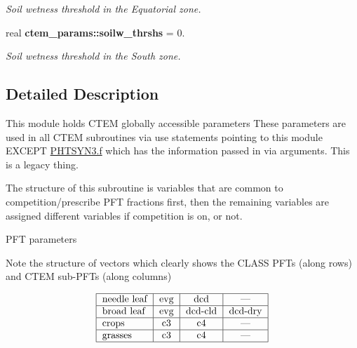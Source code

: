 \begin{DoxyCompactItemize}
\begin{DoxyCompactList}\small\item\em Soil wetness threshold in the Equatorial zone. \end{DoxyCompactList}\item 
\hypertarget{namespacectem__params_ae3cc62b58531c7d353cc8baac1c1fd6a}{}real {\bfseries ctem\+\_\+params\+::soilw\+\_\+thrshs} = 0.\label{namespacectem__params_ae3cc62b58531c7d353cc8baac1c1fd6a}

\begin{DoxyCompactList}\small\item\em Soil wetness threshold in the South zone. \end{DoxyCompactList}\end{DoxyCompactItemize}


\subsection{Detailed Description}
This module holds C\+T\+E\+M globally accessible parameters These parameters are used in all C\+T\+E\+M subroutines via use statements pointing to this module E\+X\+C\+E\+P\+T \hyperlink{PHTSYN3_8f}{P\+H\+T\+S\+Y\+N3.\+f} which has the information passed in via arguments. This is a legacy thing. 

The structure of this subroutine is variables that are common to competition/prescribe P\+F\+T fractions first, then the remaining variables are assigned different variables if competition is on, or not.

P\+F\+T parameters

Note the structure of vectors which clearly shows the C\+L\+A\+S\+S P\+F\+Ts (along rows) and C\+T\+E\+M sub-\/\+P\+F\+Ts (along columns)

\[ \begin{tabular} { | l | c | c | c | } \hline needle leaf & evg & dcd & --- \\ \hline broad leaf & evg & dcd-cld & dcd-dry \\ \hline crops & c3 & c4 & --- \\ \hline grasses & c3 & c4 & --- \\ \hline \end{tabular} \] 